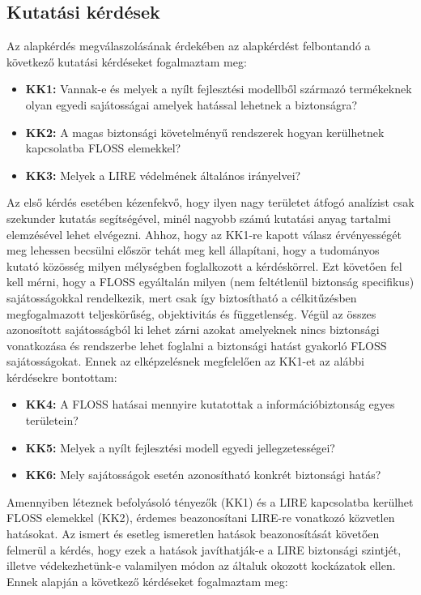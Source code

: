 \documentclass[12pt,magyar,a4paper,oneside]{scrreprt}
\providecommand{\tightlist}{%
  \setlength{\itemsep}{0pt}\setlength{\parskip}{0pt}}
\begin{document}
\hypertarget{kutatuxe1si-kuxe9rduxe9sek}{%
\subsection{Kutatási kérdések}\label{kutatuxe1si-kuxe9rduxe9sek}}

Az alapkérdés megválaszolásának érdekében az alapkérdést felbontandó a
következő kutatási kérdéseket fogalmaztam meg:

\begin{itemize}
\tightlist
\item
  \textbf{KK1:} Vannak-e és melyek a nyílt fejlesztési modellből
  származó termékeknek olyan egyedi sajátosságai amelyek hatással
  lehetnek a biztonságra?
\item
  \textbf{KK2:} A magas biztonsági követelményű rendszerek hogyan
  kerülhetnek kapcsolatba FLOSS elemekkel?
\item
  \textbf{KK3:} Melyek a LIRE védelmének általános irányelvei?
\end{itemize}

Az első kérdés esetében kézenfekvő, hogy ilyen nagy területet átfogó
analízist csak szekunder kutatás segítségével, minél nagyobb számú
kutatási anyag tartalmi elemzésével lehet elvégezni. Ahhoz, hogy az
KK1-re kapott válasz érvényességét meg lehessen becsülni először tehát
meg kell állapítani, hogy a tudományos kutató közösség milyen mélységben
foglalkozott a kérdéskörrel. Ezt követően fel kell mérni, hogy a FLOSS
egyáltalán milyen (nem feltétlenül biztonság specifikus) sajátosságokkal
rendelkezik, mert csak így biztosítható a célkitűzésben megfogalmazott
teljeskörűség, objektivitás és függetlenség. Végül az összes azonosított
sajátosságból ki lehet zárni azokat amelyeknek nincs biztonsági
vonatkozása és rendszerbe lehet foglalni a biztonsági hatást gyakorló
FLOSS sajátosságokat. Ennek az elképzelésnek megfelelően az KK1-et az
alábbi kérdésekre bontottam:

\begin{itemize}
\tightlist
\item
  \textbf{KK4:} A FLOSS hatásai mennyire kutatottak a
  információbiztonság egyes területein?
\item
  \textbf{KK5:} Melyek a nyílt fejlesztési modell egyedi
  jellegzetességei?
\item
  \textbf{KK6:} Mely sajátosságok esetén azonosítható konkrét biztonsági
  hatás?
\end{itemize}

Amennyiben léteznek befolyásoló tényezők (KK1) és a LIRE kapcsolatba
kerülhet FLOSS elemekkel (KK2), érdemes beazonosítani LIRE-re vonatkozó
közvetlen hatásokat. Az ismert és esetleg ismeretlen hatások
beazonosítását követően felmerül a kérdés, hogy ezek a hatások
javíthatják-e a LIRE biztonsági szintjét, illetve védekezhetünk-e
valamilyen módon az általuk okozott kockázatok ellen. Ennek alapján a
következő kérdéseket fogalmaztam meg:
\end{document}
